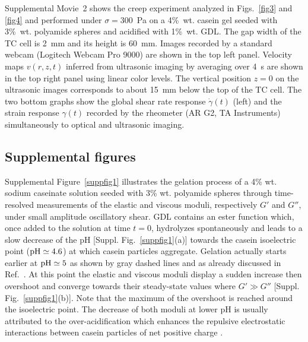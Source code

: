\documentclass[twocolumn,superscriptaddress,showpacs,preprintnumbers,amsmath,amssymb,prl]{revtex4}
\newcommand\gp{\dot\gamma}
\begin{document}
Supplemental Movie~2 shows the creep experiment analyzed in Figs.~\ref{fig3} and \ref{fig4} and performed under $\sigma=300$~Pa on a 4\%~wt. casein gel seeded with 3\%~wt. polyamide spheres and acidified with 1\%~wt. GDL. The gap width of the TC cell is 2~mm and its height is 60~mm. Images recorded by a standard webcam (Logitech Webcam Pro 9000) are shown in the top left panel. Velocity maps $v(r,z,t)$ inferred from ultrasonic imaging by averaging over 4~s are shown in the top right panel using linear color levels. The vertical position $z=0$ on the ultrasonic images corresponds to about 15~mm below the top of the TC cell. The two bottom graphs show the global shear rate response $\gp(t)$ (left) and the strain response $\gamma(t)$ recorded by the rheometer (AR G2, TA Instruments) simultaneously to optical and ultrasonic imaging.

\subsection*{Supplemental figures} 

Supplemental Figure~\ref{suppfig1} illustrates the gelation process of a 4\% wt. sodium caseinate solution seeded with 3\% wt. polyamide spheres through time-resolved measurements of the elastic and viscous moduli, respectively $G'$ and $G''$, under small amplitude oscillatory shear. GDL contains an ester function which, once added to the solution at time $t=0$, hydrolyzes spontaneously and leads to a slow decrease of the pH [Suppl. Fig.~\ref{suppfig1}(a)] towards the casein isoelectric point (${\rm pH}\simeq 4.6$) at which casein particles aggregate. Gelation actually starts earlier at ${\rm pH}\simeq 5$ as shown by gray dashed lines and as already discussed in Ref.~\cite{Lucey:1998supp}. At this point the elastic and viscous moduli display a sudden increase then overshoot and converge towards their steady-state values where $G'\gg G''$ [Suppl. Fig.~\ref{suppfig1}(b)]. Note that the maximum of the overshoot is reached around the isoelectric point. The decrease of both moduli at lower pH is usually attributed to the over-acidification which enhances the repulsive electrostatic interactions between casein particles of net positive charge \cite{Dickinson:2002supp}.   
\end{document}
